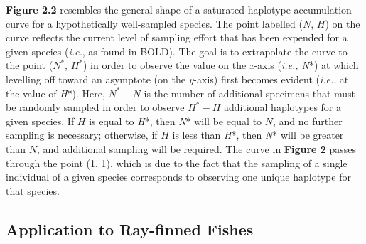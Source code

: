 \noindent \textbf{Figure 2.2} resembles the general shape of a saturated haplotype accumulation curve for a hypothetically well-sampled species. The point labelled ($N$, $H$) on the curve reflects the current level of sampling effort that has been expended for a given species (\textit{i.e.}, as found in BOLD). The goal is to extrapolate the curve to the point ($N^*$, $H^*$) in order to observe the value on the \textit{x}-axis (\textit{i.e., N}*) at which levelling off toward an asymptote (on the \textit{y}-axis) first becomes evident (\textit{i.e.}, at the value of \textit{H}*). Here, $N^*-N$ is the number of additional specimens that must be randomly sampled in order to observe $H^*-H$ additional haplotypes for a given species. If $H$ is equal to \textit{H}*, then \textit{N}* will be equal to $N$, and no further sampling is necessary; otherwise, if $H$ is less than \textit{H}*, then \textit{N}* will be greater than $N$, and additional sampling will be required.  The curve in \textbf{Figure 2} passes through the point (1, 1), which is due to the fact that the sampling of a single individual of a given species corresponds to observing one unique haplotype for that species.



\subsection{Application to Ray-finned Fishes}

